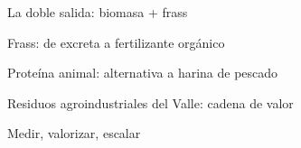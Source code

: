\documentclass[aspectratio=169, 11pt]{beamer}
\begin{document}

\begin{frame}{La doble salida: biomasa + frass}
\end{frame}

\begin{frame}{Frass: de excreta a fertilizante orgánico}
\end{frame}

\begin{frame}{Proteína animal: alternativa a harina de pescado}
\end{frame}

\begin{frame}{Residuos agroindustriales del Valle: cadena de valor}
\end{frame}


\begin{frame}{Medir, valorizar, escalar}
\end{frame}
\end{document}
